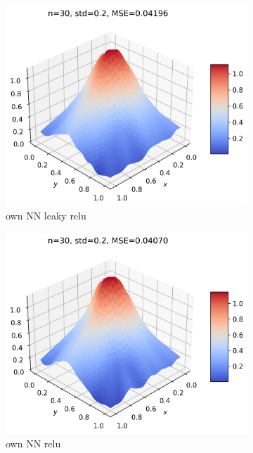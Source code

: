 \documentclass[11pt]{article}
\begin{document}
\begin{figure}[H]
\begin{subfigure}{.5\textwidth}
        \includegraphics[width=.92\textwidth]{../figures/NN_lrelu_franke.png}
        \caption{own NN leaky relu}
        \label{fig:}
    \end{subfigure}
    \begin{subfigure}{.5\textwidth}
        \centering
        \includegraphics[width=.92\textwidth]{../figures/NN_relu_franke.png}
        \caption{own NN relu}
        \label{fig:}
    \end{subfigure}
    \begin{subfigure}{.5\textwidth}
        \centering

\end{subfigure}
\end{figure}
\end{document}
